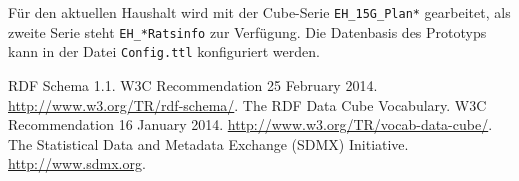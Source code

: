 \documentclass[a4paper,11pt,twoside]{article}
\begin{document}
Für den aktuellen Haushalt wird mit der Cube-Serie \texttt{EH\_15G\_Plan*}
gearbeitet, als zweite Serie steht \texttt{EH\_*Ratsinfo} zur Verfügung.  Die
Datenbasis des Prototyps kann in der Datei \texttt{Config.ttl} konfiguriert
werden.


\begin{thebibliography}{xxx}
 RDF Schema 1.1.  W3C Recommendation 25 February 2014.
  \url{http://www.w3.org/TR/rdf-schema/}.
 The RDF Data Cube Vocabulary.  W3C Recommendation 16 January
  2014.  \url{http://www.w3.org/TR/vocab-data-cube/}.
 The Statistical Data and Metadata Exchange (SDMX) Initiative.
  \url{http://www.sdmx.org}.
\end{thebibliography}
\end{document}
